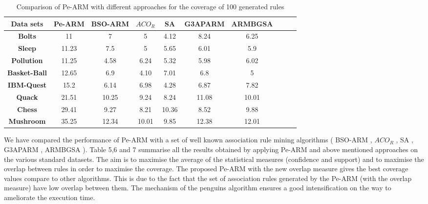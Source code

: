 \documentclass[preprint,12pt]{elsarticle}
\begin{document}
\begin{table}[htbp]
\small
\centering
\caption{Comparison of Pe-ARM with different approaches for the coverage of 100 generated rules}
\begin{tabular}{c c c c c c c c c c}
\toprule
\textbf{Data sets} & Pe-ARM& BSO-ARM & $ACO_{R}$ & SA & G3APARM & ARMBGSA \\
\midrule
\textbf{Bolts}&11&	7	& 5& 4.12 & 8.24 & 6.25 &\\\hline
\textbf{Sleep}&11.23& 7.5	& 5 & 5.65 & 6.01 & 5.9 &\\\hline
\textbf{Pollution}&11.25&	4.58 & 6.24 & 5.32 & 5.98 & 6.02 &\\\hline
\textbf{Basket-Ball}&12.65&	6.9 & 4.10 & 7.01 & 6.8 & 5 &\\\hline
\textbf{IBM-Quest}&15.2& 6.14	& 6.98 & 4.28 & 6.87 & 7.82 &\\\hline
\textbf{Quack}&21.51&	10.25	& 9.24 & 8.24 & 11.08 & 10.01 &\\\hline
\textbf{Chess}&29.41&	9.27	& 8.21 & 10.36 & 8.52 & 9.88 &\\\hline
\textbf{Mushroom}&35.25& 12.34	& 10.01 & 9.85 & 12.38 & 12.01 &\\\hline
\bottomrule
\end{tabular}
\end{table}
\newpage
We have compared the performance of Pe-ARM with a set of well known association rule mining algorithms ( BSO-ARM \cite{22} , $ACO_{R}$ \cite{13}, 
SA \cite{30}, G3APARM  \cite{11},  ARMBGSA \cite{21}).
Table 5,6 and 7 summarise all the results obtained by applying Pe-ARM and above mentioned approaches on the various standard datasets. 
The aim is to maximise the average of the statistical measures (confidence and support) and to maximise the overlap 
between rules in order to maximise the coverage.
The proposed Pe-ARM with the new overlap measure gives the best coverage values compare to other  algorithms. This is due to the fact that the set of association rules generated by the Pe-ARM (with the overlap measure) have low overlap between them. 
The mechanism of the penguins algorithm ensures a good intensification  on the way to ameliorate the execution time.

 
\end{document}
